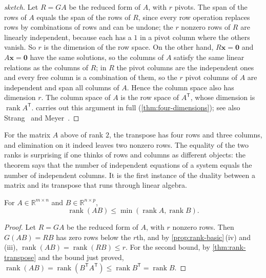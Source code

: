 \begin{proof}[sketch]
Let $R=GA$ be the reduced form of $A$, with $r$ pivots. The span of the rows of $A$ equals the span of the rows of $R$, since every row operation replaces rows by combinations of rows and can be undone; the $r$ nonzero rows of $R$ are linearly independent, because each has a $1$ in a pivot column where the others vanish. So $r$ is the dimension of the row space. On the other hand, $R\mathbf x=\mathbf 0$ and $A\mathbf x=\mathbf 0$ have the same solutions, so the columns of $A$ satisfy the same linear relations as the columns of $R$; in $R$ the pivot columns are the independent ones and every free column is a combination of them, so the $r$ pivot columns of $A$ are independent and span all columns of $A$. Hence the column space also has dimension $r$. The column space of $A$ is the row space of $A^{\mathsf T}$, whose dimension is $\operatorname{rank}A^{\mathsf T}$.  carries out this argument in full (\cref{thm:four-dimensions}); see also Strang~\cite[Chap.~3]{strang2016} and Meyer~\cite[Chap.~4]{meyer2000}.
\end{proof}

For the matrix $A$ above of rank $2$, the transpose has four rows and three columns, and elimination on it indeed leaves two nonzero rows. The equality of the two ranks is surprising if one thinks of rows and columns as different objects: the theorem says that the number of independent equations of a system equals the number of independent columns. It is the first instance of the duality between a matrix and its transpose that runs through linear algebra.

\begin{proposition}
\label{prop:rank-product}
For $A\in\mathbb R^{m\times n}$ and $B\in\mathbb R^{n\times p}$,
\[
\operatorname{rank}(AB)\le\min(\operatorname{rank}A,\operatorname{rank}B).
\]
\end{proposition}

\begin{proof}
Let $R=GA$ be the reduced form of $A$, with $r$ nonzero rows. Then $G(AB)=RB$ has zero rows below the $r$th, and by \cref{prop:rank-basic}\,(iv) and (iii), $\operatorname{rank}(AB)=\operatorname{rank}(RB)\le r$. For the second bound, by \cref{thm:rank-transpose} and the bound just proved, $\operatorname{rank}(AB)=\operatorname{rank}(B^{\mathsf T}A^{\mathsf T})\le\operatorname{rank}B^{\mathsf T}=\operatorname{rank}B$.
\end{proof}

